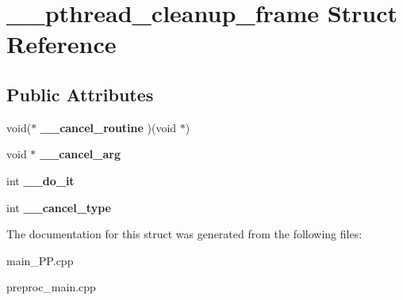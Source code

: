\hypertarget{struct____pthread__cleanup__frame}{\section{\+\_\+\+\_\+pthread\+\_\+cleanup\+\_\+frame Struct Reference}
\label{struct____pthread__cleanup__frame}
}
\subsection*{Public Attributes}
\begin{DoxyCompactItemize}
\item 
\hypertarget{struct____pthread__cleanup__frame_a1eae70fedebae61c644f6a66b3f11409}{void($\ast$ {\bfseries \+\_\+\+\_\+cancel\+\_\+routine} )(void $\ast$)}\label{struct____pthread__cleanup__frame_a1eae70fedebae61c644f6a66b3f11409}

\item 
\hypertarget{struct____pthread__cleanup__frame_a4b6438785bb57fb563dc990db49c5337}{void $\ast$ {\bfseries \+\_\+\+\_\+cancel\+\_\+arg}}\label{struct____pthread__cleanup__frame_a4b6438785bb57fb563dc990db49c5337}

\item 
\hypertarget{struct____pthread__cleanup__frame_a94d8f4f2eb4291692e566c64521526c4}{int {\bfseries \+\_\+\+\_\+do\+\_\+it}}\label{struct____pthread__cleanup__frame_a94d8f4f2eb4291692e566c64521526c4}

\item 
\hypertarget{struct____pthread__cleanup__frame_a78f4c60c3d98634907158aa8b69ec014}{int {\bfseries \+\_\+\+\_\+cancel\+\_\+type}}\label{struct____pthread__cleanup__frame_a78f4c60c3d98634907158aa8b69ec014}

\end{DoxyCompactItemize}


The documentation for this struct was generated from the following files\+:\begin{DoxyCompactItemize}
\item 
main\+\_\+\+P\+P.\+cpp\item 
preproc\+\_\+main.\+cpp\end{DoxyCompactItemize}
